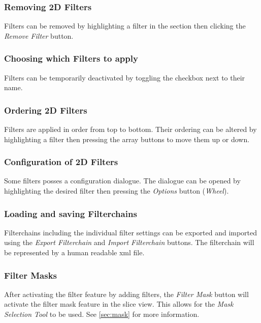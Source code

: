 \subsubsection{Removing 2D Filters}

Filters can be removed by highlighting a filter in the section then clicking the \emph{Remove Filter} button.

\subsubsection{Choosing which Filters to apply}

Filters can be temporarily deactivated by toggling the checkbox next to their name.

\subsubsection{Ordering 2D Filters}

Filters are applied in order from top to bottom. Their ordering can be altered by highlighting a filter then pressing the array buttons to move them up or down.

\subsubsection{Configuration of 2D Filters}

Some filters posses a configuration dialogue. The dialogue can be opened by highlighting the desired filter then pressing the \emph{Options} button (\emph{Wheel}).

\subsubsection{Loading and saving Filterchains}

Filterchains including the individual filter settings can be exported and imported using the \emph{Export Filterchain} and \emph{Import Filterchain} buttons. The filterchain will be represented by a human readable xml file.

\subsubsection{Filter Masks}

After activating the filter feature by adding filters, the \emph{Filter Mask} button will activate the filter mask feature in the slice view. This allows for the \emph{Mask Selection Tool} to be used. See \ref{sec:mask} for more information.

